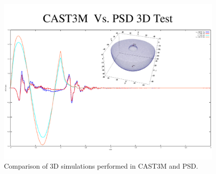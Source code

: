 \begin{figure}
	\centering
	\includegraphics[width=.85\textwidth]{./Images/Cast3MPSD.pdf}
	\caption{Comparison of 3D simulations performed  in CAST3M and PSD.   }\label{fig:CastemPSD3D}
\end{figure}

